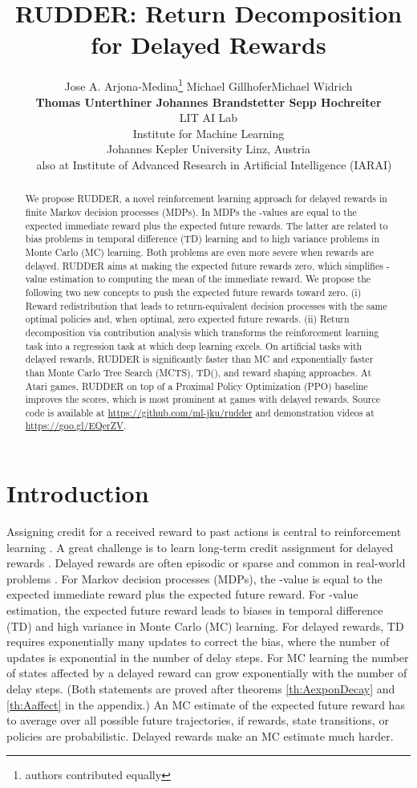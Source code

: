 \documentclass{article}
\title{RUDDER: Return Decomposition for Delayed Rewards}
\author{\vspace{0.1cm} Jose A. Arjona-Medina\thanks{authors contributed equally} \quad Michael Gillhofer\footnotemark[1] \quad Michael Widrich\footnotemark[1] \\ {\vspace{0.1cm}\bf Thomas Unterthiner \quad Johannes Brandstetter \quad Sepp Hochreiter\footnotemark[2]} \\
  LIT AI Lab \\ Institute for Machine Learning\\
  Johannes Kepler University Linz, Austria \\
  \footnotemark[2]~~also at Institute of Advanced Research in Artificial Intelligence (IARAI)
}
\begin{document}
\maketitle


\begin{abstract}
We propose RUDDER,
a novel reinforcement learning approach
for delayed rewards in finite Markov decision processes (MDPs).
In MDPs the -values are equal to the
expected immediate reward plus the expected future rewards.
The latter are related to bias problems 
in temporal difference (TD) learning and to
high variance problems in Monte Carlo (MC) learning.
Both problems are even more severe when rewards are delayed.
RUDDER aims at making the expected future rewards
zero, which simplifies -value estimation to
computing the mean of the immediate reward.
We propose the following two new concepts to push the
expected future rewards toward zero.
(i) Reward redistribution that leads to return-equivalent
decision processes with the same optimal policies and, when optimal,
zero expected future rewards.
(ii) Return decomposition via contribution analysis which
transforms the reinforcement learning task 
into a regression task at which deep learning excels. 
On artificial tasks with delayed rewards,
RUDDER is significantly faster than 
MC and exponentially faster than Monte Carlo Tree Search (MCTS), TD(),
and reward shaping approaches.
At Atari games, 
RUDDER on top of a Proximal Policy Optimization (PPO) baseline improves the scores, 
which is most prominent at games with delayed rewards.
Source code is available at \url{https://github.com/ml-jku/rudder} and demonstration videos at \url{https://goo.gl/EQerZV}.
\end{abstract}

\section{Introduction}

Assigning credit for a received reward to past actions
is central to reinforcement learning \cite{Sutton:18book}.
A great challenge is to learn long-term credit assignment for delayed 
rewards \cite{Ke:18,Hung:18,Hernandez-Leal:18,Sahni:18}.
Delayed rewards are often episodic or sparse
and common in real-world problems \cite{Rahmandad:09,Luoma:17}.
For Markov decision processes (MDPs), 
the -value is equal to the expected immediate reward plus 
the expected future reward.
For -value estimation,
the expected future reward leads to biases in temporal difference (TD) and
high variance in Monte Carlo (MC) learning.
For delayed rewards, 
TD requires exponentially many updates to correct the bias, 
where the number of updates is exponential in the number of delay steps.
For MC learning the number of states affected by a delayed reward can 
grow exponentially with the number of delay steps. 
(Both statements are proved after 
theorems \ref{th:AexponDecay} and \ref{th:Aaffect} in the appendix.)
An MC estimate of the expected future reward 
has to average over all possible future trajectories,
if rewards, state transitions, or policies are probabilistic.
Delayed rewards make an MC estimate much harder.
    
\end{document}
